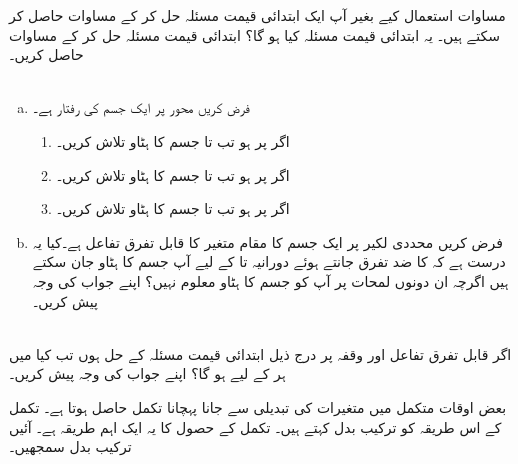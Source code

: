 مساوات  استعمال کیے بغیر آپ   ایک ابتدائی قیمت مسئلہ حل کر کے مساوات حاصل کر سکتے ہیں۔ یہ ابتدائی قیمت مسئلہ کیا ہو گا؟ ابتدائی قیمت  مسئلہ  حل کر کے  مساوات   حاصل کریں۔
\\
\\
\begin{enumerate}[a.]
\item
فرض کریں محور  پر ایک جسم کی رفتار  ہے۔
\begin{enumerate}[1.]
\item
اگر  پر  ہو تب  تا  جسم کا ہٹاو تلاش کریں۔
\item
اگر  پر  ہو تب  تا  جسم کا ہٹاو تلاش کریں۔
\item
اگر  پر  ہو تب  تا  جسم کا ہٹاو تلاش کریں۔
\end{enumerate}
\item
فرض کریں محددی لکیر پر ایک جسم کا مقام  متغیر  کا قابل تفرق تفاعل ہے۔کیا یہ درست ہے کہ  کا ضد تفرق جانتے ہوئے دورانیہ  تا  کے لیے آپ جسم کا ہٹاو جان سکتے ہیں اگرچہ ان دونوں لمحات پر آپ کو جسم کا ہٹاو معلوم نہیں؟ اپنے جواب  کی وجہ پیش کریں۔  
\end{enumerate}
\\
اگر قابل تفرق تفاعل  اور  وقفہ  پر درج ذیل ابتدائی قیمت مسئلہ  کے حل ہوں تب کیا  میں ہر  کے لیے  ہو گا؟ اپنے جواب کی وجہ پیش کریں۔



بعض اوقات متکمل   میں  متغیرات کی تبدیلی سے جانا پہچانا تکمل حاصل ہوتا ہے۔ تکمل کے اس طریقہ کو ترکیب بدل کہتے ہیں۔  تکمل کے حصول کا یہ ایک اہم   طریقہ ہے۔ آئیں  ترکیب  بدل سمجھیں۔

